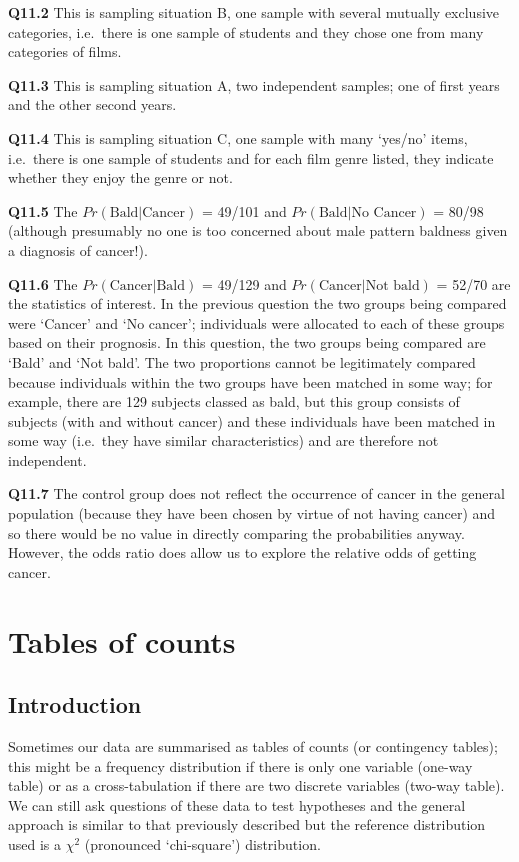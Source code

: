 \documentclass[
  oneside]{krantz}
\begin{document}
\textbf{Q11.2} This is sampling situation B, one sample with several mutually exclusive categories, i.e.~there is one sample of students and they chose one from many categories of films.

\textbf{Q11.3} This is sampling situation A, two independent samples; one of first years and the other second years.

\textbf{Q11.4} This is sampling situation C, one sample with many `yes/no' items, i.e.~there is one sample of students and for each film genre listed, they indicate whether they enjoy the genre or not.

\textbf{Q11.5} The \(Pr(\textrm{Bald|Cancer})\) = 49/101 and \(Pr(\textrm{Bald|No Cancer})\) = 80/98 (although presumably no one is too concerned about male pattern baldness given a diagnosis of cancer!).

\textbf{Q11.6} The \(Pr(\textrm{Cancer|Bald})\) = 49/129 and \(Pr(\textrm{Cancer|Not bald})\) = 52/70 are the statistics of interest. In the previous question the two groups being compared were `Cancer' and `No cancer'; individuals were allocated to each of these groups based on their prognosis. In this question, the two groups being compared are `Bald' and `Not bald'. The two proportions cannot be legitimately compared because individuals within the two groups have been matched in some way; for example, there are 129 subjects classed as bald, but this group consists of subjects (with and without cancer) and these individuals have been matched in some way (i.e.~they have similar characteristics) and are therefore not independent.

\textbf{Q11.7} The control group does not reflect the occurrence of cancer in the general population (because they have been chosen by virtue of not having cancer) and so there would be no value in directly comparing the probabilities anyway. However, the odds ratio does allow us to explore the relative odds of getting cancer.

\hypertarget{tableofcounts}{%
\chapter{Tables of counts}\label{tableofcounts}}

\hypertarget{introduction}{%
\section{Introduction}\label{introduction}}

Sometimes our data are summarised as tables of counts (or contingency tables); this might be a frequency distribution if there is only one variable (one-way table) or as a cross-tabulation if there are two discrete variables (two-way table). We can still ask questions of these data to test hypotheses and the general approach is similar to that previously described but the reference distribution used is a \(\chi^2\) (pronounced `chi-square') distribution.
\end{document}
